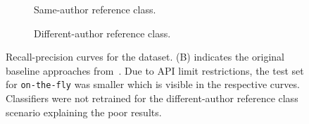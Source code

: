 \begin{figure}[htbp]
  \centering
  \begin{subfigure}[b]{0.49\textwidth}
    \centering
    
    \caption{Same-author reference class. }
    \label{fig:blog_same_author}
  \end{subfigure}
  \hfill
  \begin{subfigure}[b]{0.49\textwidth}
    \centering
    
    \caption{Different-author reference class.}
    \label{fig:blog_diff_author}
  \end{subfigure}
  \caption[Recall-precision curves for the \dataBlog{} dataset. ]{Recall-precision curves for the \dataBlog{} dataset. 
  (B) indicates the original baseline approaches from~\citep{koppel_determining_2014}.
  Due to API limit restrictions, the test set for \texttt{on-the-fly} was smaller which is visible in the respective curves.
  Classifiers were not retrained for the different-author reference class scenario explaining the poor results.}
  \label{fig:diff_imp_gen_blog}
\end{figure}
